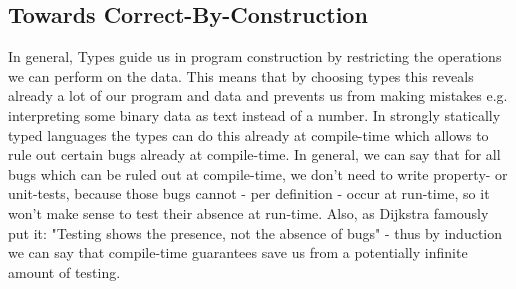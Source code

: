 

\subsection{Towards Correct-By-Construction}
In general, Types guide us in program construction by restricting the operations we can perform on the data. This means that by choosing types this reveals already a lot of our program and data and prevents us from making mistakes e.g. interpreting some binary data as text instead of a number. In strongly statically typed languages the types can do this already at compile-time which allows to rule out certain bugs already at compile-time. In general, we can say that for all bugs which can be ruled out at compile-time, we don't need to write property- or unit-tests, because those bugs cannot - per definition - occur at run-time, so it won't make sense to test their absence at run-time. Also, as Dijkstra famously put it: "Testing shows the presence, not the absence of bugs" - thus by induction we can say that compile-time guarantees save us from a potentially infinite amount of testing.

